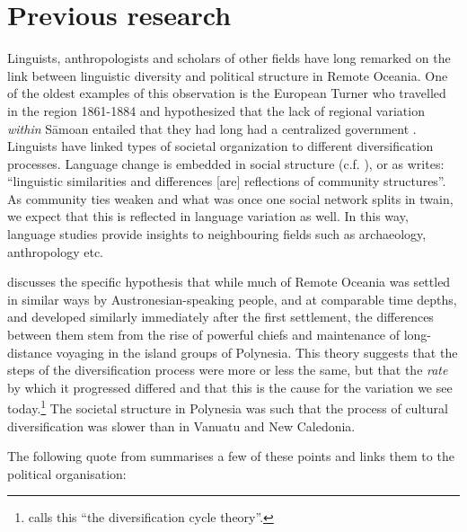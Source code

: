 \documentclass[unnumsec,webpdf,modern,medium]{oup-authoring-template}
\begin{document}
\section{Previous research}
\label{sec:previous_research}
Linguists, anthropologists and scholars of other fields have long remarked on the link between linguistic diversity and political structure in Remote Oceania. One of the oldest examples of this observation is the European Turner who travelled in the region 1861-1884 and hypothesized that the lack of regional variation \emph{within} S\={a}moan entailed that they had long had a centralized government \citep[172]{turner1884}. Linguists have linked types of societal organization to different diversification processes. Language change is embedded in social structure (c.f. \citep{WLH1968}), or as \citet[124]{grace_1992_aberrant} writes: ``linguistic similarities and differences [are] reflections of community structures''. As community ties weaken and what was once one social network splits in twain, we expect that this is reflected in language variation as well. In this way, language studies provide insights to neighbouring fields such as archaeology, anthropology etc.

\citet{pawley81, pawley2007} discusses the specific hypothesis that while much of Remote Oceania was settled in similar ways by Austronesian-speaking people, and at comparable time depths, and developed similarly immediately after the first settlement, the differences between them stem from the rise of powerful chiefs and maintenance of long-distance voyaging in the island groups of Polynesia. This theory suggests that the steps of the diversification process were more or less the same, but that the \emph{rate} by which it progressed differed and that this is the cause for the variation we see today.\footnote{\citet{lynch1981melanesian} calls this ``the diversification cycle theory''.} The societal structure in Polynesia was such that the process of cultural diversification was slower than in Vanuatu and New Caledonia. 

The following quote from \citet{pawley2007} summarises a few of these points and links them to the political organisation:

\end{document}
